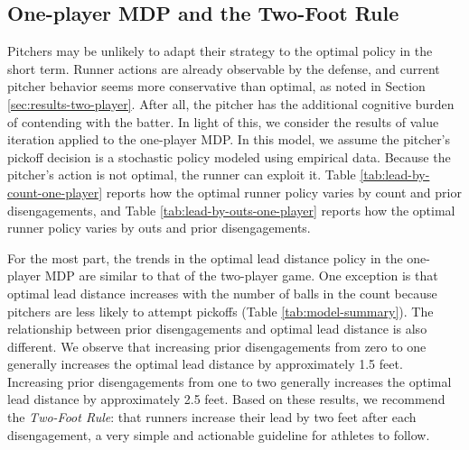 \documentclass[11pt]{article}
\newcommand{\tablepath}{tables/}
\newcommand{\inputtable}[1]{}
\begin{document}
    \subsection{One-player MDP and the Two-Foot Rule}
    \label{sec:two-foot-rule}

      Pitchers may be unlikely to adapt their strategy to the optimal policy in the short term. Runner actions are already observable by the defense, and current pitcher behavior seems more conservative than optimal, as noted in Section \ref{sec:results-two-player}. After all, the pitcher has the additional cognitive burden of contending with the batter. In light of this, we consider the results of value iteration applied to the one-player MDP. In this model, we assume the pitcher's pickoff decision is a stochastic policy modeled using empirical data. Because the pitcher's action is not optimal, the runner can exploit it. Table \ref{tab:lead-by-count-one-player} reports how the optimal runner policy varies by count and prior disengagements, and Table \ref{tab:lead-by-outs-one-player} reports how the optimal runner policy varies by outs and prior disengagements.

      \begin{table}
        \centering
        \inputtable{lead_by_count_one_player.tex}
        \caption{
          \it The optimal lead distance (in feet) by count and prior disengagements under the single-player MDP, assuming an average runner on first base facing an average battery (pitcher and catcher) with no outs and third base empty.
        }
        \label{tab:lead-by-count-one-player}
      \end{table}

      For the most part, the trends in the optimal lead distance policy in the one-player MDP are similar to that of the two-player game. One exception is that optimal lead distance increases with the number of balls in the count because pitchers are less likely to attempt pickoffs (Table \ref{tab:model-summary}). The relationship between prior disengagements and optimal lead distance is also different. We observe that increasing prior disengagements from zero to one generally increases the optimal lead distance by approximately 1.5 feet. Increasing prior disengagements from one to two generally increases the optimal lead distance by approximately 2.5 feet. Based on these results, we recommend the {\it Two-Foot Rule}: that runners increase their lead by two feet after each disengagement, a very simple and actionable guideline for athletes to follow.
      
\end{document}
